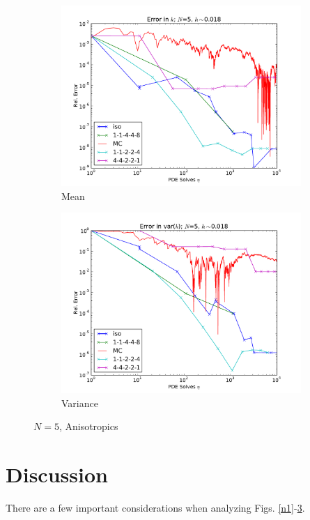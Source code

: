 \documentclass[11pt]{article}
\begin{document}
\begin{figure}[H]
\centering
  \begin{subfigure}[b]{0.49 \textwidth}
   \includegraphics[width=\textwidth]{N5_h5_aniso1}
   \caption{Mean}
   \label{aniso1}
  \end{subfigure}
  \begin{subfigure}[b]{0.49 \textwidth}
   \includegraphics[width=\textwidth]{N5_h5_aniso2}
   \caption{Variance}
   \label{aniso2}
  \end{subfigure}
  \caption{$N=5$, Anisotropics}
  \label{aniso}
\end{figure}


\section{Discussion}
There are a few important considerations when analyzing Figs. \ref{n1}-\ref{aniso}.\\
\end{document}
